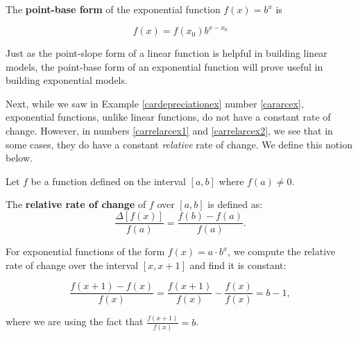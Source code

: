 \documentclass{ximera}
\begin{document}
\smallskip


\begin{definition} \label{expfcnpointbaseform}  The   \textbf{point-base form} of the exponential function $f(x) = b^{x}$  is

\[ f(x) = f(x_{0}) b^{x - x_{0}} \]


\end{definition}


\smallskip

Just as the point-slope form of a linear function is helpful in building linear models, the point-base form of an exponential function will prove useful in building exponential models.

\smallskip

Next, while we saw in Example \ref{cardepreciationex} number \ref{cararcex}, exponential functions, unlike linear functions, do not have a constant rate of change.  However, in numbers \ref{carrelarcex1} and \ref{carrelarcex2}, we see that in some cases, they do have a constant \textit{relative} rate of change.  We define this notion below.

\smallskip



\begin{definition} \label{rrc}  Let $f$ be a function defined on the interval $[a,b]$ where $f(a) \neq 0$.

The \textbf{relative rate of  change}  of $f$ over $[a,b]$ is defined as: \[ \dfrac{\Delta [f(x)] }{f(a)} = \dfrac{f(b) - f(a)}{f(a)} .\]

\end{definition}


\smallskip

For exponential functions of the form $f(x) = a \cdot b^{x}$, we compute the relative rate of change over the interval $[x, x+1]$ and find it is constant:

\[ \dfrac{f(x+1) - f(x)}{f(x)} = \dfrac{f(x+1)}{f(x)} - \dfrac{f(x)}{f(x)} = b -1,\]

where we are using the fact that $\frac{f(x+1)}{f(x)} = b$. 

\smallskip
\end{document}
